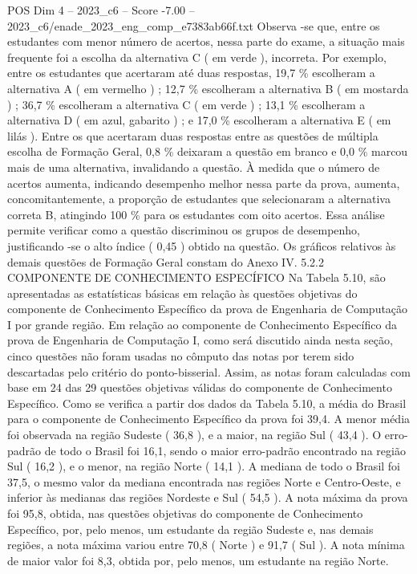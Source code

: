 \begin{textsample}{POS Dim 4 – 2023\_c6 – Score -7.00 – 2023\_c6/enade\_2023\_eng\_comp\_e7383ab66f.txt}
Observa -se que, entre os estudantes com menor número de acertos, nessa parte do exame, a situação mais frequente foi a escolha da alternativa C ( em verde ), incorreta.
Por exemplo, entre os estudantes que acertaram até duas respostas, 19,7 \% escolheram a alternativa A ( em vermelho ) ; 12,7 \% escolheram a alternativa B ( em mostarda ) ; 36,7 \% escolheram a alternativa C ( em verde ) ; 13,1 \% escolheram a alternativa D ( em azul, gabarito ) ; e 17,0 \% escolheram a alternativa E ( em lilás ).
Entre os que acertaram duas respostas entre as questões de múltipla escolha de Formação Geral, 0,8 \% deixaram a questão em branco e 0,0 \% marcou mais de uma alternativa, invalidando a questão.
À medida que o número de acertos aumenta, indicando desempenho melhor nessa parte da prova, aumenta, concomitantemente, a proporção de estudantes que selecionaram a alternativa correta B, atingindo 100 \% para os estudantes com oito acertos.
Essa análise permite verificar como a questão discriminou os grupos de desempenho, justificando -se o alto índice ( 0,45 ) obtido na questão.
Os gráficos relativos às demais questões de Formação Geral constam do Anexo IV. 5.2.2 COMPONENTE DE CONHECIMENTO ESPECÍFICO Na Tabela 5.10, são apresentadas as estatísticas básicas em relação às questões objetivas do componente de Conhecimento Específico da prova de Engenharia de Computação I por grande região.
Em relação ao componente de Conhecimento Específico da prova de Engenharia de Computação I, como será discutido ainda nesta seção, cinco questões não foram usadas no cômputo das notas por terem sido descartadas pelo critério do ponto-bisserial.
Assim, as notas foram calculadas com base em 24 das 29 questões objetivas válidas do componente de Conhecimento Específico.
Como se verifica a partir dos dados da Tabela 5.10, a média do Brasil para o componente de Conhecimento Específico da prova foi 39,4.
A menor média foi observada na região Sudeste ( 36,8 ), e a maior, na região Sul ( 43,4 ).
O erro-padrão de todo o Brasil foi 16,1, sendo o maior erro-padrão encontrado na região Sul ( 16,2 ), e o menor, na região Norte ( 14,1 ).
A mediana de todo o Brasil foi 37,5, o mesmo valor da mediana encontrada nas regiões Norte e Centro-Oeste, e inferior às medianas das regiões Nordeste e Sul ( 54,5 ).
A nota máxima da prova foi 95,8, obtida, nas questões objetivas do componente de Conhecimento Específico, por, pelo menos, um estudante da região Sudeste e, nas demais regiões, a nota máxima variou entre 70,8 ( Norte ) e 91,7 ( Sul ).
A nota mínima de maior valor foi 8,3, obtida por, pelo menos, um estudante na região Norte.

\end{textsample}
